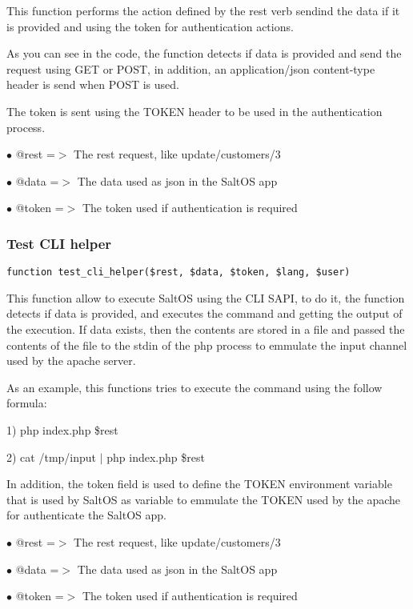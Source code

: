 \documentclass[a4paper]{article}
\begin{document}
This function performs the action defined by the rest verb sendind the data if it is
provided and using the token for authentication actions.

As you can see in the code, the function detects if data is provided and send the request
using GET or POST, in addition, an application/json content-type header is send when POST
is used.

The token is sent using the TOKEN header to be used in the authentication process.

\begin{compactitem}
\item[\color{myblue}$\bullet$] @rest  =$>$ The rest request, like update/customers/3
\item[\color{myblue}$\bullet$] @data  =$>$ The data used as json in the SaltOS app
\item[\color{myblue}$\bullet$] @token =$>$ The token used if authentication is required
\end{compactitem}

\hypertarget{toc10}{}
\subsubsection{Test CLI helper}

\begin{lstlisting}
function test_cli_helper($rest, $data, $token, $lang, $user)
\end{lstlisting}

This function allow to execute SaltOS using the CLI SAPI, to do it, the function
detects if data is provided, and executes the command and getting the output of
the execution. If data exists, then the contents are stored in a file and passed
the contents of the file to the stdin of the php process to emmulate the input
channel used by the apache server.

As an example, this functions tries to execute the command using the follow formula:

1) php index.php \$rest

2) cat /tmp/input $|$ php index.php \$rest

In addition, the token field is used to define the TOKEN environment variable that
is used by SaltOS as variable to emmulate the TOKEN used by the apache for authenticate
the SaltOS app.

\begin{compactitem}
\item[\color{myblue}$\bullet$] @rest  =$>$ The rest request, like update/customers/3
\item[\color{myblue}$\bullet$] @data  =$>$ The data used as json in the SaltOS app
\item[\color{myblue}$\bullet$] @token =$>$ The token used if authentication is required
\end{compactitem}
\end{document}
